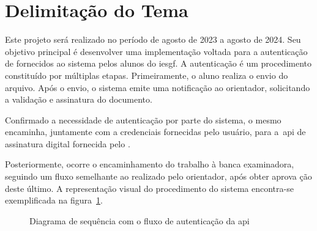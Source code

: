 \section{Delimitação do Tema}\label{sec:delimitacao-do-tema}

Este projeto será realizado no período de agosto de 2023 a agosto de 2024.
Seu objetivo principal é desenvolver uma implementação voltada para a
autenticação de  fornecidos ao sistema pelos alunos do
\acrfull{iesgf}.
A autenticação é um procedimento constituído por múltiplas etapas.
Primeiramente, o aluno realiza o envio do arquivo.
Após o envio, o sistema emite uma notificação ao orientador, solicitando a
validação e assinatura do documento.

Confirmado a necessidade de autenticação por parte do sistema, o mesmo
encaminha,
juntamente com a credenciais fornecidas pelo usuário, para a~\acrshort{api} de
assinatura digital fornecida pelo \citeauthor*{govbr2020}.

Posteriormente, ocorre o encaminhamento do trabalho à banca examinadora,
seguindo um fluxo semelhante ao realizado pelo orientador, após obter aprova
ção deste último.
A representação visual do procedimento do sistema encontra-se exemplificada
na figura~\ref{fig:diagrama-sequencia-api}.

\begin{figure}[h!]
    \caption[Diagrama de sequência Autenticação \acrshort{api}]{
        Diagrama de sequência com o fluxo de autenticação
        da \acrshort{api}}
    \sourcesearchfootnote
    \label{fig:diagrama-sequencia-api}
\end{figure}

